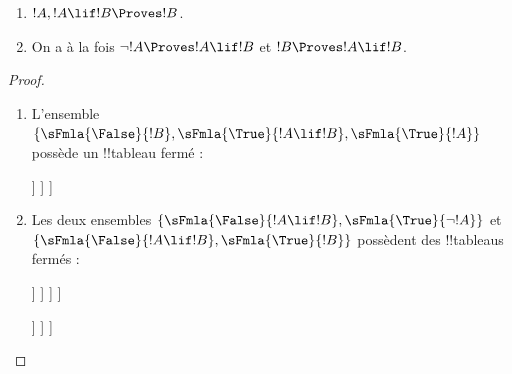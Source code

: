 \documentclass[../../../include/open-logic-section]{subfiles}
\begin{document}
\begin{prop}
  \begin{enumerate}
  \item {}  $!A, !A \lif !B \Proves !B$.
  \item {}
    On a à la fois $\lnot !A \Proves !A \lif !B$ et
    $!B \Proves !A \lif !B$.
  \end{enumerate}
\end{prop}

\begin{proof}
  \begin{enumerate}
    \item L'ensemble $\{\sFmla{\False}{!B},
      \sFmla{\True}{!A \lif !B}, \sFmla{\True}{!A}\}$ possède un
      !!{tableau} fermé :
      \begin{oltableau}
        [\sFmla{\False}{\formula{B}}, just=\TAss
          [\sFmla{\True}{\formula{A} \lif \formula{B}}, just=\TAss
            [\sFmla{\True}{\formula{A}}, just=\TAss
              [\sFmla{\False}{\formula{A}}, just = {\TRule{\True}{\lif}[2]}, close]
              [\sFmla{\True}{\formula{B}}, just = {\TRule{\True}{\lif}[2]}, close]
            ]
          ]
        ]
      \end{oltableau}
    \item Les deux ensembles $\{\sFmla{\False}{!A \lif !B},
      \sFmla{\True}{\lnot !A}\}$ et $\{\sFmla{\False}{!A \lif !B},
      \sFmla{\True}{!B}\}$ possèdent des !!{tableau}s fermés :
      \begin{oltableau}
        [\sFmla{\False}{\formula{A} \lif \formula{B}}, just = \TAss
          [\sFmla{\True}{\lnot \formula{A}}, just = \TAss
            [\sFmla{\True}{\formula{A}}, just = {\TRule{\False}{\lif}[1]}
              [\sFmla{\False}{\formula{B}}, just = {\TRule{\False}{\lif}[1]}
                [\sFmla{\False}{\formula{A}}, just = {\TRule{\True}{\lnot}[2]}, close]
              ]
            ]
          ]
        ]
      \end{oltableau}
      \begin{oltableau}
        [\sFmla{\False}{\formula{A} \lif \formula{B}}, just = \TAss
          [\sFmla{\True}{\formula{B}}, just = \TAss
            [\sFmla{\True}{\formula{A}}, just = {\TRule{\False}{\lif}[1]}
              [\sFmla{\False}{\formula{B}}, just = {\TRule{\False}{\lif}[1]},close
              ]
            ]
          ]
        ]
      \end{oltableau}
  \end{enumerate}
\end{proof}

%
%
%
%
%
%
%
%
\end{document}
